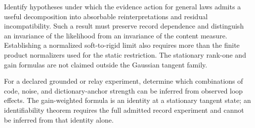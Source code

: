 \documentclass[11pt,letterpaper]{report}
\begin{document}
Identify hypotheses under which the evidence action for general laws admits a useful decomposition into absorbable reinterpretations and residual incompatibility. Such a result must preserve record dependence and distinguish an invariance of the likelihood from an invariance of the content measure. Establishing a normalized soft-to-rigid limit also requires more than the finite product normalizers used for the static restriction. The stationary rank-one and gain formulas are not claimed outside the Gaussian tangent family.

For a declared grounded or relay experiment, determine which combinations of code, noise, and dictionary-anchor strength can be inferred from observed loop effects. The gain-weighted formula is an identity at a stationary tangent state; an identifiability theorem requires the full admitted record experiment and cannot be inferred from that identity alone.

\begingroup
\small
\setlength{\bibsep}{3pt}


\endgroup
\end{document}
